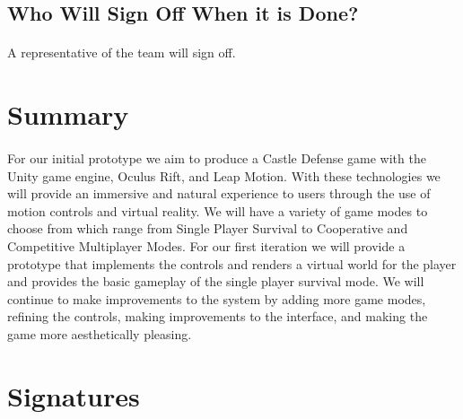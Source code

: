 \subsection{Who Will Sign Off When it is Done?}

\paragraph{} A representative of the team will sign off.

\section{Summary}

\paragraph{} For our initial prototype we aim to produce a Castle Defense game with the Unity game engine, Oculus Rift, and Leap Motion. With these technologies we will provide an immersive and natural experience to users through the use of motion controls and virtual reality. We will have a variety of game modes to choose from which range from Single Player Survival to Cooperative and Competitive Multiplayer Modes. For our first iteration we will provide a prototype that  implements the controls and renders a virtual world for the player and provides the basic gameplay of the single player survival mode. We will continue to make improvements to the system by adding more game modes, refining the controls, making improvements to the interface, and making the game more aesthetically pleasing.

\section{Signatures}

\noindent {}

